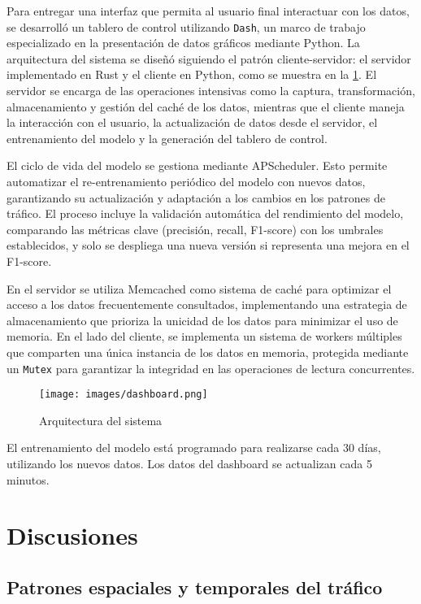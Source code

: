 \documentclass[12pt]{article}
\begin{document}
Para entregar una interfaz que permita al usuario final interactuar con los datos, se desarrolló un tablero de control utilizando \texttt{Dash}, un marco de trabajo especializado en la presentación de datos gráficos mediante Python. La arquitectura del sistema se diseñó siguiendo el patrón cliente-servidor: el servidor implementado en Rust y el cliente en Python, como se muestra en la \cref{fig:architecture}. El servidor se encarga de las operaciones intensivas como la captura, transformación, almacenamiento y gestión del caché de los datos, mientras que el cliente maneja la interacción con el usuario, la actualización de datos desde el servidor, el entrenamiento del modelo y la generación del tablero de control.

El ciclo de vida del modelo se gestiona mediante APScheduler. Esto permite automatizar el re-entrenamiento periódico del modelo con nuevos datos, garantizando su actualización y adaptación a los cambios en los patrones de tráfico. El proceso incluye la validación automática del rendimiento del modelo, comparando las métricas clave (precisión, recall, F1-score) con los umbrales establecidos, y solo se despliega una nueva versión si representa una mejora en el F1-score.

En el servidor se utiliza Memcached como sistema de caché para optimizar el acceso a los datos frecuentemente consultados, implementando una estrategia de almacenamiento que prioriza la unicidad de los datos para minimizar el uso de memoria. En el lado del cliente, se implementa un sistema de workers múltiples que comparten una única instancia de los datos en memoria, protegida mediante un \texttt{Mutex} para garantizar la integridad en las operaciones de lectura concurrentes.

\begin{figure}[H]
    \centering
    \texttt{[image: images/dashboard.png]}
    \caption{Arquitectura del sistema}
    \label{fig:architecture}
\end{figure}

El entrenamiento del modelo está programado para realizarse cada 30 días, utilizando los nuevos datos. Los datos del dashboard se actualizan cada 5 minutos.

\section{Discusiones}

\subsection{Patrones espaciales y temporales del tráfico}
\end{document}
